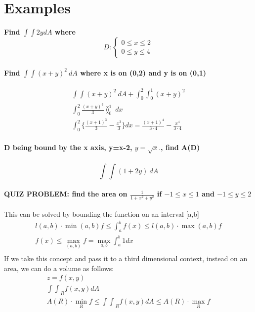 \documentclass[11pt,fleqn]{book} %
\begin{document}
\section{Examples}
\paragraph{Find $\int \int 2y dA$ where $$D: \begin{cases}
    0 \leq x \leq 2\\
    0 \leq y \leq 4
\end{cases}$$}

\paragraph{Find $\int \int (x+y)^2 \ dA$ where x is on (0,2) and y is on (0,1)}
\begin{gather}
    \int \int (x+y)^2 \ dA + \int_0^2 \int_0^1 (x+y)^2\\
    \int_0^2 \frac{(x+y)^3}{3} \between_0^1 \ dx \\
    \int_0^2 \{ \frac{(x+1)^3}{3} - \frac{x^3}{3} \} dx = \frac{(x+1)^4}{3 \cdot 4} - \frac{x^4}{3 \cdot 4} 
\end{gather}

\paragraph*{D being bound by the x axis, y=x-2, $y = \sqrt{x}.$, find A(D)}

\paragraph*{$$\int \int (1 + 2y) \ dA $$}

\paragraph*{\textbf{QUIZ PROBLEM:} find the area on $\frac{1}{1+x^2+y^2}$ if $-1 \leq x \leq 1$ and $-1 \leq y \leq 2$}
This can be solved by bounding the function on an interval [a,b]
\begin{gather}
    l(a,b) \cdot \min(a,b) f \leq \int_a^b f(x) \leq l(a,b) \cdot \max(a,b) f\\
    f(x) \leq \max_{(a,b)}f = \max_{a,b} \int_{a}^{b} 1 dx\\
\end{gather}
If we take this concept and pass it to a third dimensional context, instead on an area, we can do a volume as follows:
\begin{gather}
    z = f(x,y)\\
    {\int\int}_{R} f(x,y) dA \\
    A(R) \cdot \min_{R} f \leq {\int\int}_{R} f(x,y) dA \leq A(R) \cdot \max_{R} f \\
\end{gather}
\end{document}
